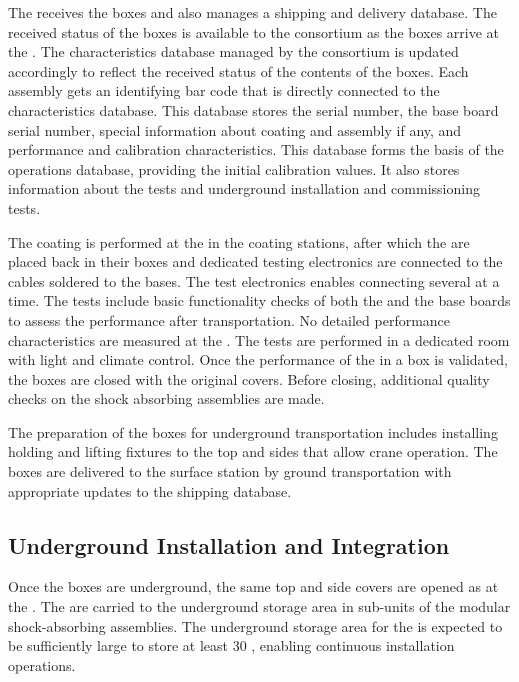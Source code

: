 The  receives the  boxes and also manages a shipping and delivery database. The received status of the boxes is available to the \dual {} consortium as the boxes arrive at the . The  characteristics database managed by the \dual {} consortium is updated accordingly to reflect the received status of the contents of the boxes. Each  assembly gets an identifying bar code that is directly connected to the  characteristics database. This database stores the  serial number, the base board serial number, special information about  coating and assembly if any, and performance and calibration characteristics. This database  forms the basis of the operations database, providing the initial calibration values. It also stores information about the  tests and underground installation and commissioning tests.

The  coating is performed at the  in the coating stations, after which  the  are placed back in their boxes and dedicated testing electronics are connected to the  cables soldered to the  bases. The test electronics enables connecting several  at a time. The tests include basic functionality checks of both the  and the base boards to assess the performance after transportation. No detailed performance characteristics are measured at the . The tests are performed in a dedicated room with light and climate control. Once the performance of the  in a box is validated, the boxes are closed with the original covers. Before closing, additional quality checks on the shock absorbing assemblies are made.

The preparation of the  boxes for underground transportation includes installing holding and lifting fixtures to the top and sides %
that allow crane operation. The boxes are delivered to the surface station by ground transportation with %
appropriate updates to the shipping database.

\subsection{Underground Installation and Integration}
\label{sec:fddp-pd-9.3}

Once the  boxes are underground, the same top and side covers are opened as at the . The  are carried to the underground storage area in sub-units of the modular shock-absorbing assemblies. The underground storage area for the  is expected to be sufficiently large to store at least \num{30} , enabling continuous installation operations.


